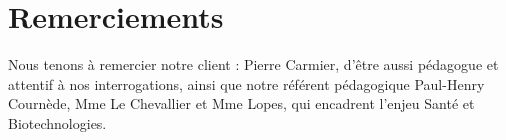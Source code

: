 \section{Remerciements}
Nous tenons à remercier notre client : Pierre Carmier, d'être aussi pédagogue et attentif à nos interrogations, ainsi que notre référent pédagogique Paul-Henry Cournède, Mme Le Chevallier et Mme Lopes, qui encadrent l'enjeu Santé et Biotechnologies.